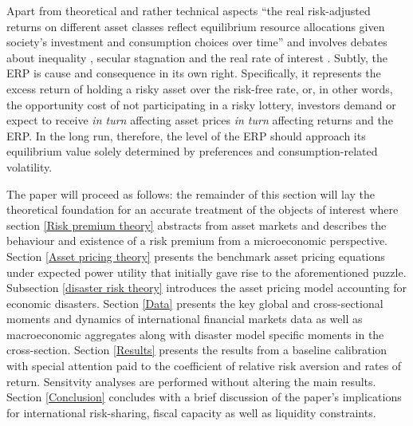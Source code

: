 Apart from theoretical and rather technical aspects ``the real risk-adjusted returns on different asset classes reflect equilibrium resource allocations given society’s investment and consumption choices over time'' \cite{Jorda2017} and involves debates about inequality \cite{Piketty2015}, secular stagnation \cite{Summers2014} and the real rate of interest \cite{Holston2017}. Subtly, the ERP is cause and consequence in its own right. Specifically, it represents the excess return of holding a risky asset over the risk-free rate, or, in other words, the opportunity cost of not participating in a risky lottery, investors demand or expect to receive \textit{in turn} affecting asset prices \textit{in turn} affecting returns and the ERP. In the long run, therefore, the level of the ERP should approach its equilibrium value solely determined by preferences and consumption-related volatility.

The paper will proceed as follows: the remainder of this section will lay the theoretical foundation for an accurate treatment of the objects of interest where section \ref{Risk premium theory} abstracts from asset markets and describes the behaviour and existence of a risk premium from a microeconomic perspective. Section \ref{Asset pricing theory} presents the benchmark asset pricing equations under expected power utility that initially gave rise to the aforementioned puzzle. Subsection \ref{disaster risk theory} introduces the asset pricing model accounting for economic disasters. Section \ref{Data} presents the key global and cross-sectional moments and dynamics of international financial markets data as well as macroeconomic aggregates along with disaster model specific moments in the cross-section. Section \ref{Results} presents the results from a baseline calibration with special attention paid to the coefficient of relative risk aversion and rates of return. Sensitvity analyses are performed without altering the main results. Section \ref{Conclusion} concludes with a brief discussion of the paper's implications for international risk-sharing, fiscal capacity as well as liquidity constraints.


